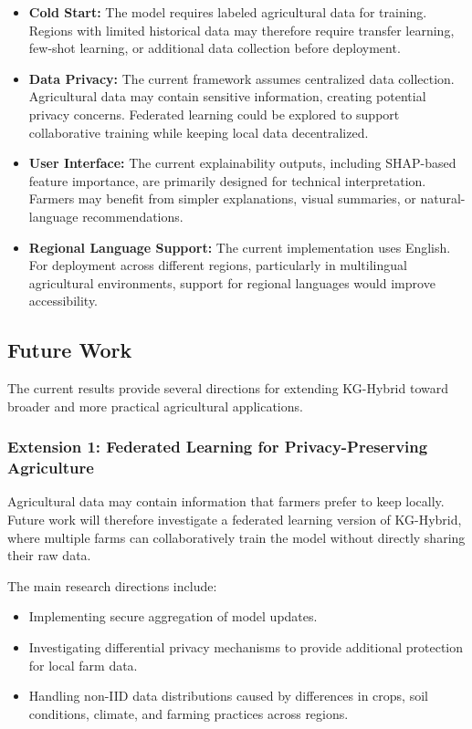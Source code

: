 \documentclass[journal]{IEEEtran}
\begin{document}
\begin{itemize}[leftmargin=1.2em]
    \item \textbf{Cold Start:} The model requires labeled agricultural data for training. Regions with limited historical data may therefore require transfer learning, few-shot learning, or additional data collection before deployment.

    \item \textbf{Data Privacy:} The current framework assumes centralized data collection. Agricultural data may contain sensitive information, creating potential privacy concerns. Federated learning could be explored to support collaborative training while keeping local data decentralized.

    \item \textbf{User Interface:} The current explainability outputs, including SHAP-based feature importance, are primarily designed for technical interpretation. Farmers may benefit from simpler explanations, visual summaries, or natural-language recommendations.

    \item \textbf{Regional Language Support:} The current implementation uses English. For deployment across different regions, particularly in multilingual agricultural environments, support for regional languages would improve accessibility.
\end{itemize}

\subsection{Future Work}

The current results provide several directions for extending KG-Hybrid toward broader and more practical agricultural applications.

\subsubsection{Extension 1: Federated Learning for Privacy-Preserving Agriculture}

Agricultural data may contain information that farmers prefer to keep locally. Future work will therefore investigate a federated learning version of KG-Hybrid, where multiple farms can collaboratively train the model without directly sharing their raw data.

The main research directions include:

\begin{itemize}[leftmargin=1.2em]
    \item Implementing secure aggregation of model updates.

    \item Investigating differential privacy mechanisms to provide additional protection for local farm data.

    \item Handling non-IID data distributions caused by differences in crops, soil conditions, climate, and farming practices across regions.
\end{itemize}
\end{document}
